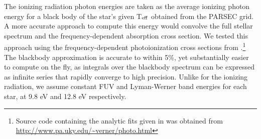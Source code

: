 \documentclass[twocolumn]{aastex61}
\begin{document}
The ionizing radiation photon energies are taken as the average ionizing photon energy for a black body of the star's given T$_{\rm eff}$ obtained from the PARSEC grid. A more accurate approach to compute this energy would convolve the full stellar spectrum and the frequency-dependent absorption cross section. We tested this approach using the frequency-dependent photoionization cross sections from \citet{1996ApJ...465..487V}.\footnote{Source code containing the analytic fits given in \citet{1996ApJ...465..487V} was obtained from \url{http://www.pa.uky.edu/~verner/photo.html}} 
The blackbody approximation is accurate to within 5\%, yet substantially easier to compute on the fly, as integrals over the blackbody spectrum can be expressed as infinite series that rapidly converge to high precision. Unlike for the ionizing radiation, we assume constant FUV and Lyman-Werner band energies for each star, at 9.8 eV and 12.8 eV respectively.
\end{document}
